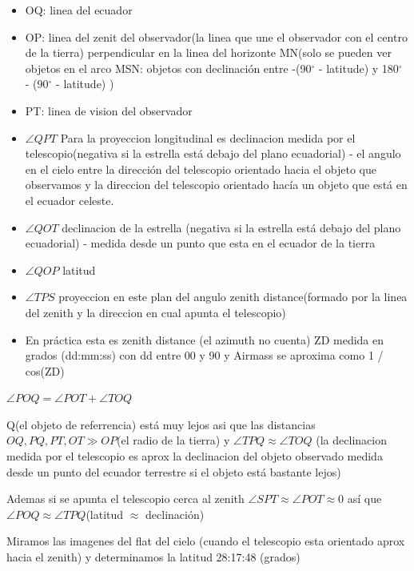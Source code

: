 \documentclass{article}
\begin{document}
\vspace{5cm}
\begin{itemize}
\item OQ: linea del ecuador
\item OP: linea del zenit del observador(la linea que une el observador con el centro de la tierra) perpendicular en la linea del horizonte MN(solo se pueden ver objetos en el arco MSN: objetos con declinación entre -(90$^\circ$ - latitude) y 180$^\circ$ - (90$^\circ$ - latitude) )
\item PT: linea de vision del observador
\item $\angle{QPT}$ Para la proyeccion longitudinal es declinacion medida por el telescopio(negativa si la estrella está debajo del plano ecuadorial) - el angulo en el cielo entre la dirección del telescopio orientado hacia el objeto que observamos y la direccion del telescopio orientado hacía un objeto que está en el ecuador celeste. 
\item $\angle{QOT}$  declinacion  de la estrella (negativa si la estrella está debajo del plano ecuadorial) - medida desde un punto que esta en el ecuador de la tierra 
\item $\angle{QOP}$  latitud
\item $\angle{TPS}$  proyeccion en este plan del angulo zenith distance(formado por la linea del zenith y la direccion en cual apunta el telescopio) 
\item En práctica esta es zenith distance (el azimuth no cuenta) ZD medida en grados  (dd:mm:ss) con dd entre 00 y 90
y Airmass se aproxima como 1 / cos(ZD)


\end{itemize}
\begin{description}
\item $\angle{POQ} = \angle{POT} + \angle{TOQ}$
\item Q(el objeto de referrencia) está muy lejos asi que las distancias $OQ, PQ, PT, OT \gg OP$(el radio de la tierra) y  $\angle{TPQ}\approx \angle{TOQ} $ (la declinacion medida por el telescopio es aprox la declinacion del objeto observado medida desde un punto del ecuador terrestre si el objeto está bastante lejos)  	
\item Ademas si se apunta el telescopio cerca al zenith $\angle{SPT} \approx \angle{POT} \approx 0$ así que $\angle{POQ} \approx \angle{TPQ}$(latitud $\approx$ declinación)
\item Miramos las imagenes del flat del cielo (cuando el telescopio esta orientado aprox hacia el zenith) y determinamos la latitud 28:17:48
(grados)
\end{description}
\end{document}
